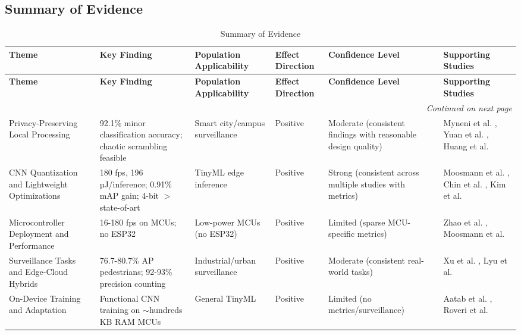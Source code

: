\documentclass[12pt, a4paper]{article}
\begin{document}
\subsection{Summary of Evidence}

\begin{landscape}
\footnotesize
\begin{longtable}{ p{3.5cm} p{4.5cm} p{3.5cm} p{2cm} p{3.5cm} p{4cm} }
\caption{Summary of Evidence} \label{tab:summary} \\
\toprule
\textbf{Theme} & \textbf{Key Finding} & \textbf{Population Applicability} & \textbf{Effect Direction} & \textbf{Confidence Level} & \textbf{Supporting Studies} \\
\midrule
\endfirsthead
\toprule
\textbf{Theme} & \textbf{Key Finding} & \textbf{Population Applicability} & \textbf{Effect Direction} & \textbf{Confidence Level} & \textbf{Supporting Studies} \\
\midrule
\endhead
\midrule
\multicolumn{6}{r}{\textit{Continued on next page}} \\
\endfoot
\bottomrule
\endlastfoot

Privacy-Preserving Local Processing & 92.1\% minor classification accuracy; chaotic scrambling feasible & Smart city/campus surveillance & Positive & Moderate (consistent findings with reasonable design quality) & Myneni et al. \cite{myneni2022}, Yuan et al. \cite{yuan2020}, Huang et al. \cite{huang2023} \\

CNN Quantization and Lightweight Optimizations & 180 fps, 196 µJ/inference; 0.91\% mAP gain; 4-bit $>$ state-of-art & TinyML edge inference & Positive & Strong (consistent across multiple studies with metrics) & Moosmann et al. \cite{moosmann2023}, Chin et al. \cite{chin2022}, Kim et al. \cite{kim2020} \\

Microcontroller Deployment and Performance & 16-180 fps on MCUs; no ESP32 & Low-power MCUs (no ESP32) & Positive & Limited (sparse MCU-specific metrics) & Zhao et al. \cite{zhao2020}, Moosmann et al. \cite{moosmann2023} \\

Surveillance Tasks and Edge-Cloud Hybrids & 76.7-80.7\% AP pedestrians; 92-93\% precision counting & Industrial/urban surveillance & Positive & Moderate (consistent real-world tasks) & Xu et al. \cite{xu2021}, Lyu et al. \cite{lyu2022} \\

On-Device Training and Adaptation & Functional CNN training on $\sim$hundreds KB RAM MCUs & General TinyML & Positive & Limited (no metrics/surveillance) & Aatab et al. \cite{aatab2023}, Roveri et al. \cite{roveri2022} \\

\end{longtable}
\end{landscape}
\end{document}
